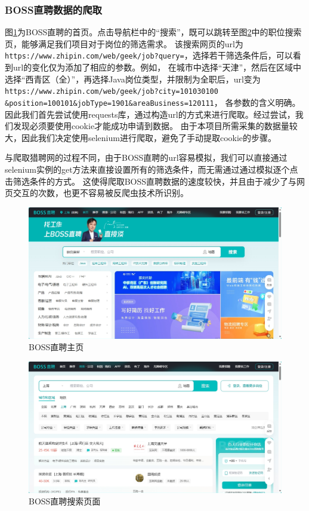 \subsubsection{BOSS直聘数据的爬取}

图\ref{BOSS}为BOSS直聘的首页。点击导航栏中的“搜索”，既可以跳转至图\ref{BOSSJob}中的职位搜索页，能够满足我们项目对于岗位的筛选需求。
该搜索网页的url为\texttt{https://www.zhipin.com/web/geek/job?query=}，选择若干筛选条件后，可以看到url的变化仅为添加了相应的参数。例如，
在城市中选择“天津”，然后在区域中选择“西青区（全）”，再选择Java岗位类型，并限制为全职后，url变为\texttt{https://www.zhipin.com/web/geek/job?city=101030100\\\&position=100101\&jobType=1901\&areaBusiness=120111}，
各参数的含义明确。因此我们首先尝试使用requests库，通过构造url的方式来进行爬取。经过尝试，我们发现必须要使用cookie才能成功申请到数据。
由于本项目所需采集的数据量较大，因此我们决定使用selenium进行爬取，避免了手动提取cookie的步骤。

与爬取猎聘网的过程不同，由于BOSS直聘的url容易模拟，我们可以直接通过selenium实例的get方法来直接设置所有的筛选条件，而无需通过通过模拟逐个点击筛选条件的方式。
这使得爬取BOSS直聘数据的速度较快，并且由于减少了与网页交互的次数，也更不容易被反爬虫技术所识别。

\begin{figure}[!htbp]
    \centering
    \includegraphics[width=\textwidth]{figures/BOSS}
    \caption{BOSS直聘主页}\label{BOSS}
\end{figure}

\begin{figure}[!htbp]
    \centering
    \includegraphics[width=\textwidth]{figures/BOSSJob.png}
    \caption{BOSS直聘搜索页面}\label{BOSSJob}
\end{figure}

